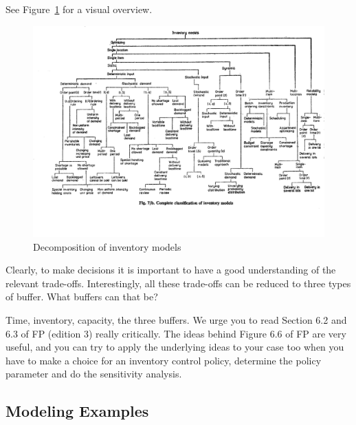 \begin{question}
See Figure~\ref{fig:costs} for a visual overview.

\begin{figure}
\centering
\includegraphics[width=\textwidth]{figures/chikan.png}
\caption{Decomposition of inventory models}
\label{fig:costs}
\end{figure}


\end{question}



\begin{question}
  Clearly, to make decisions it is important to have a good understanding
  of the relevant trade-offs. Interestingly, all these trade-offs can
  be reduced to three types of buffer. What buffers can that be?
  \begin{solution}
    Time, inventory, capacity, the three buffers. We urge you to read
    Section 6.2 and 6.3 of FP (edition 3) really critically. The ideas
    behind Figure 6.6 of FP are very useful, and you can try to apply the
    underlying ideas to your case too when you have to make a choice
    for an inventory control policy, determine the policy parameter
    and do the sensitivity analysis.
  \end{solution}
\end{question}



\subsection{Modeling Examples}
\label{sec:examples}

